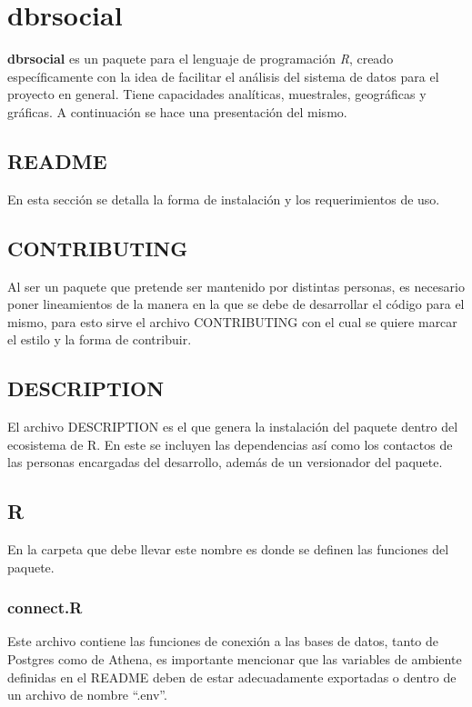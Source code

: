 \chapter{dbrsocial}
\textbf{dbrsocial} es un paquete para el lenguaje de programación \textit{R}, creado específicamente con la idea de facilitar  el análisis del sistema de datos para el proyecto en general. Tiene  capacidades analíticas, muestrales, geográficas y gráficas. A continuación se hace una presentación del mismo.
\section{README}
En esta sección se detalla la forma de instalación y los requerimientos de uso.

\section{CONTRIBUTING}
Al ser un paquete que pretende ser mantenido por distintas personas, es necesario poner lineamientos de la manera en la que se debe de desarrollar el código para el mismo, para esto sirve el archivo CONTRIBUTING con el cual se quiere marcar el estilo y la forma de contribuir.

\section{DESCRIPTION}
El archivo DESCRIPTION es el que genera la instalación del paquete dentro del ecosistema de R. En este se incluyen las dependencias así como los contactos de las personas encargadas del desarrollo, además de un versionador del paquete.

\section{R}
En la carpeta que debe llevar este nombre es donde se definen las funciones del paquete.
\subsection{connect.R}
Este archivo contiene las funciones de conexión a las bases de datos, tanto de Postgres como de Athena, es importante mencionar que las variables de ambiente definidas en el README deben de estar adecuadamente exportadas o dentro de un archivo de nombre ``.env''.

